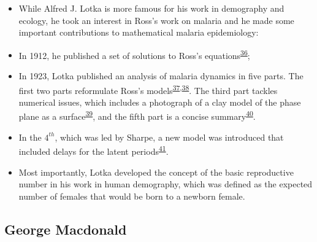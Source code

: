 \documentclass[
]{book}
\begin{document}
\begin{itemize}
\item
  While Alfred J. Lotka is more famous for his work in demography and ecology, he took an interest in Ross's work on malaria and he made some important contributions to mathematical malaria epidemiology:
\item
  In 1912, he published a set of solutions to Ross's equations\textsuperscript{\protect\hyperlink{ref-LotkaAJ1912Nature}{36}};
\item
  In 1923, Lotka published an analysis of malaria dynamics in five parts. The first two parts reformulate Ross's models\textsuperscript{\protect\hyperlink{ref-LotkaAJ1923part1}{37},\protect\hyperlink{ref-LotkaAJ1923part2}{38}}. The third part tackles numerical issues, which includes a photograph of a clay model of the phase plane as a surface\textsuperscript{\protect\hyperlink{ref-LotkaAJ1923part3}{39}}, and the fifth part is a concise summary\textsuperscript{\protect\hyperlink{ref-LotkaAJ1923part5}{40}}.
\item
  In the \(4^{th}\), which was led by Sharpe, a new model was introduced that included delays for the latent periods\textsuperscript{\protect\hyperlink{ref-LotkaAJ1923part4}{41}}.
\item
  Most importantly, Lotka developed the concept of the basic reproductive number in his work in human demography, which was defined as the expected number of females that would be born to a newborn female.
\end{itemize}

\hypertarget{george-macdonald}{%
\subsection{George Macdonald}\label{george-macdonald}}
\end{document}
